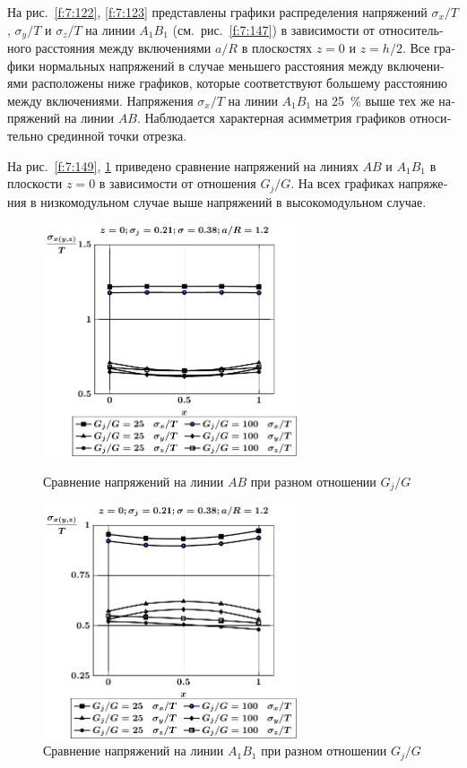 \begin{russian}
На рис.~\ref{f:7:122}, \ref{f:7:123} представлены графики распределения напряжений $\sigma_x/T$, $\sigma_y/T$ и $\sigma_z/T$ на линии $A_1B_1$ (см.~рис.~\ref{f:7:147}) в зависимости от относительного расстояния между включениями $a/R$ в плоскостях $z=0$ и $z=h/2$. Все графики нормальных напряжений в случае меньшего расстояния между включениями расположены ниже графиков, которые соответствуют большему расстоянию между включениями. Напряжения $\sigma_x/T$ на линии $A_1B_1$ на 25~\% выше тех же напряжений на линии $AB$. Наблюдается характерная асимметрия графиков относительно срединной точки отрезка.

На рис.~\ref{f:7:149}, \ref{f:7:150} приведено сравнение напряжений на линиях $AB$ и $A_1B_1$ в плоскости $z=0$ в зависимости от отношения $G_j/G$. На всех графиках напряжения в низкомодульном случае выше напряжений в высокомодульном случае.

\begin{figure}[h!]
\centering\footnotesize
\parbox[b]{7.5cm}{\centering\includegraphics[width=7.5cm]{inc31-g-a12-h10-r10-z0.pdf}
\caption{Сравнение напряжений на линии $AB$ при разном отношении $G_j/G$
\label{f:7:149}}}\hfil\hfil
\parbox[b]{7.5cm}{\centering\includegraphics[width=7.5cm]{inc31-g-a12-h10-r10-z0-a1b1.pdf}
\caption{Сравнение напряжений на линии $A_1B_1$ при разном отношении $G_j/G$
\label{f:7:150}}}
\end{figure}


\end{russian}
